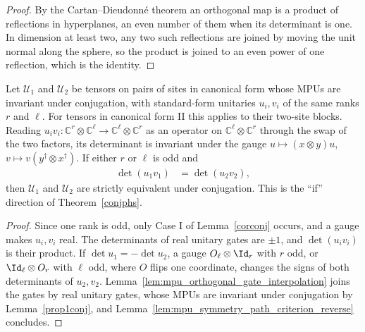 \begin{proof}
    \leanok
    By the Cartan--Dieudonn\'e theorem an orthogonal map is a product of
    reflections in hyperplanes, an even number of them when its determinant
    is one. In dimension at least two, any two such reflections are joined by
    moving the unit normal along the sphere, so the product is joined to an
    even power of one reflection, which is the identity.
\end{proof}

\begin{lemma}
    \label{thm:mpu_conjugation_odd_rank_if}
    \leanok
    Let $\mathcal U_1$ and $\mathcal U_2$ be tensors on pairs of sites in
    canonical form whose MPUs are invariant under conjugation, with
    standard-form unitaries $u_i,v_i$ of the same ranks $r$ and $\ell$. For
    tensors in canonical form II this applies to their two-site blocks.
    Reading $u_iv_i:\mathbb C^r\otimes\mathbb C^\ell\to\mathbb C^\ell\otimes
        \mathbb C^r$ as an operator on $\mathbb C^\ell\otimes\mathbb C^r$ through
    the swap of the two factors, its determinant is invariant under the gauge
    $u\mapsto(x\otimes y)u$, $v\mapsto v(y^\dagger\otimes x^\dagger)$. If
    either $r$ or $\ell$ is odd and
    \begin{align}
        \det(u_1v_1) & =\det(u_2v_2),
    \end{align}
    then $\mathcal U_1$ and $\mathcal U_2$ are strictly equivalent under
    conjugation. This is the ``if'' direction of
    Theorem~\ref{conjphs}.
\end{lemma}

\begin{proof}
    \leanok
    Since one rank is odd, only Case I of Lemma~\ref{corconj} occurs, and a
    gauge makes $u_i,v_i$ real. The determinants of real unitary gates are
    $\pm1$, and $\det(u_iv_i)$ is their product. If $\det u_1=-\det u_2$, a
    gauge $O_\ell\otimes\Id_r$ with $r$ odd, or $\Id_\ell\otimes O_r$ with
    $\ell$ odd, where $O$ flips one coordinate, changes the signs of both
    determinants of $u_2,v_2$. Lemma~\ref{lem:mpu_orthogonal_gate_interpolation}
    joins the gates by real unitary gates, whose MPUs are invariant under
    conjugation by Lemma~\ref{prop1conj}, and
    Lemma~\ref{lem:mpu_symmetry_path_criterion_reverse} concludes.
\end{proof}

